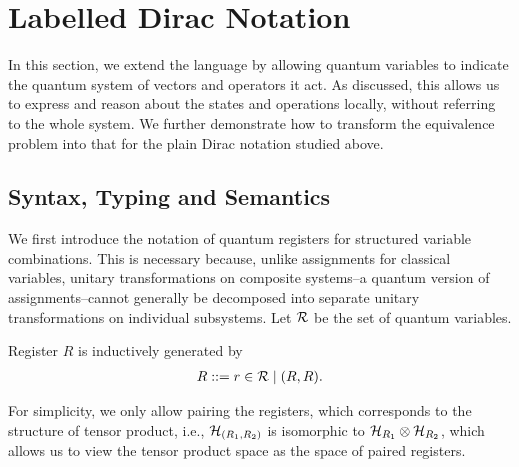
\newcommand {\cD } {{\mathcal{D}}}
\newcommand {\cl } {{\mathit{cl}}}


\section{Labelled Dirac Notation}
\label{sec: labelled}









In this section, we extend the language by allowing quantum variables to indicate the quantum system of vectors and operators it act. 
As discussed, this allows us to express and reason about the states and operations locally, without referring to the whole system. 
We further demonstrate how to transform the equivalence problem into that for the plain Dirac notation studied above.

\subsection{Syntax, Typing and Semantics}
We first introduce the notation of quantum registers for structured variable combinations. This is necessary because, unlike assignments for classical variables, unitary transformations on composite systems--a quantum version of assignments--cannot generally be decomposed into separate unitary transformations on individual subsystems.
Let $\mathcal{R}$ be the set of quantum variables.
\begin{definition} Register $R$ is inductively generated by
  \begin{align*}
    R ::= r\in\mathcal{R} \mid (R, R).
  \end{align*}
\end{definition}
For simplicity, we only allow pairing the registers, which corresponds to the structure of tensor product, i.e., ${\mathcal{H}}_{(R_1,R_2)}$ is isomorphic to ${\mathcal{H}}_{R_1}\otimes {\mathcal{H}}_{R_2}$, which allows us to view the tensor product space as the space of paired registers.

